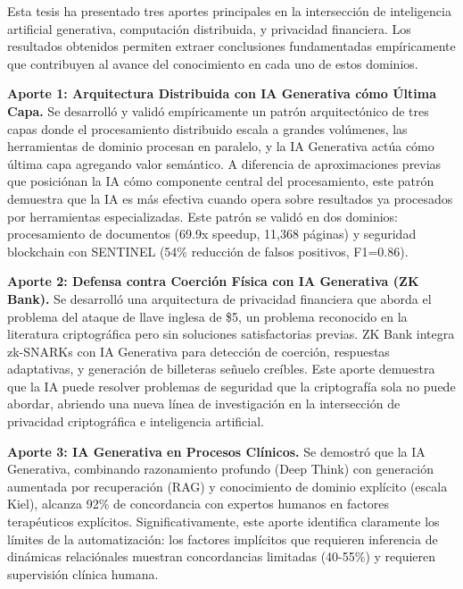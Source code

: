 \documentclass[12pt,a4paper,twoside]{book}
\begin{document}
Esta tesis ha presentado tres aportes principales en la intersección de inteligencia artificial generativa, computación distribuida, y privacidad financiera. Los resultados obtenidos permiten extraer conclusiones fundamentadas empíricamente que contribuyen al avance del conocimiento en cada uno de estos dominios.

\textbf{Aporte 1: Arquitectura Distribuida con IA Generativa cómo Última Capa.} Se desarrolló y validó empíricamente un patrón arquitectónico de tres capas donde el procesamiento distribuido escala a grandes volúmenes, las herramientas de dominio procesan en paralelo, y la IA Generativa actúa cómo última capa agregando valor semántico. A diferencia de aproximaciones previas que posiciónan la IA cómo componente central del procesamiento, este patrón demuestra que la IA es más efectiva cuando opera sobre resultados ya procesados por herramientas especializadas. Este patrón se validó en dos dominios: procesamiento de documentos (69.9x speedup, 11,368 páginas) y seguridad blockchain con SENTINEL (54\% reducción de falsos positivos, F1=0.86).

\textbf{Aporte 2: Defensa contra Coerción Física con IA Generativa (ZK Bank).} Se desarrolló una arquitectura de privacidad financiera que aborda el problema del ataque de llave inglesa de \$5, un problema reconocido en la literatura criptográfica pero sin soluciones satisfactorias previas. ZK Bank integra zk-SNARKs con IA Generativa para detección de coerción, respuestas adaptativas, y generación de billeteras señuelo creíbles. Este aporte demuestra que la IA puede resolver problemas de seguridad que la criptografía sola no puede abordar, abriendo una nueva línea de investigación en la intersección de privacidad criptográfica e inteligencia artificial.

\textbf{Aporte 3: IA Generativa en Procesos Clínicos.} Se demostró que la IA Generativa, combinando razonamiento profundo (Deep Think) con generación aumentada por recuperación (RAG) y conocimiento de dominio explícito (escala Kiel), alcanza 92\% de concordancia con expertos humanos en factores terapéuticos explícitos. Significativamente, este aporte identifica claramente los límites de la automatización: los factores implícitos que requieren inferencia de dinámicas relaciónales muestran concordancias limitadas (40-55\%) y requieren supervisión clínica humana.
\end{document}

